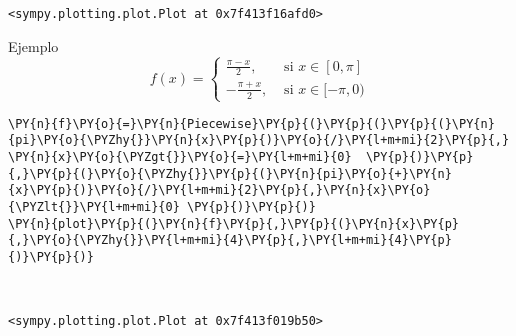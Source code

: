             \begin{tcolorbox}[breakable, boxrule=.5pt, size=fbox, pad at break*=1mm, opacityfill=0]
\begin{Verbatim}[commandchars=\\\{\}]
<sympy.plotting.plot.Plot at 0x7f413f16afd0>
\end{Verbatim}
\end{tcolorbox}
        
    Ejemplo
\[f(x)=\left\{\begin{array}{cc} \frac{\pi-x}{2}, & \text{ si } x\in [0,\pi]\\
    -\frac{\pi+x}{2}, & \text{ si } x\in [-\pi,0) \end{array}    \right.\]

    \begin{tcolorbox}[breakable, size=fbox, boxrule=1pt, pad at break*=1mm,colback=cellbackground, colframe=cellborder]
\begin{Verbatim}[commandchars=\\\{\}]
\PY{n}{f}\PY{o}{=}\PY{n}{Piecewise}\PY{p}{(}\PY{p}{(}\PY{p}{(}\PY{n}{pi}\PY{o}{\PYZhy{}}\PY{n}{x}\PY{p}{)}\PY{o}{/}\PY{l+m+mi}{2}\PY{p}{,} \PY{n}{x}\PY{o}{\PYZgt{}}\PY{o}{=}\PY{l+m+mi}{0}  \PY{p}{)}\PY{p}{,}\PY{p}{(}\PY{o}{\PYZhy{}}\PY{p}{(}\PY{n}{pi}\PY{o}{+}\PY{n}{x}\PY{p}{)}\PY{o}{/}\PY{l+m+mi}{2}\PY{p}{,}\PY{n}{x}\PY{o}{\PYZlt{}}\PY{l+m+mi}{0} \PY{p}{)}\PY{p}{)}
\PY{n}{plot}\PY{p}{(}\PY{n}{f}\PY{p}{,}\PY{p}{(}\PY{n}{x}\PY{p}{,}\PY{o}{\PYZhy{}}\PY{l+m+mi}{4}\PY{p}{,}\PY{l+m+mi}{4}\PY{p}{)}\PY{p}{)}
\end{Verbatim}
\end{tcolorbox}

    \begin{center}
    \end{center}
    { \hspace*{\fill} \\}
    
            \begin{tcolorbox}[breakable, boxrule=.5pt, size=fbox, pad at break*=1mm, opacityfill=0]
\begin{Verbatim}[commandchars=\\\{\}]
<sympy.plotting.plot.Plot at 0x7f413f019b50>
\end{Verbatim}
\end{tcolorbox}
        
